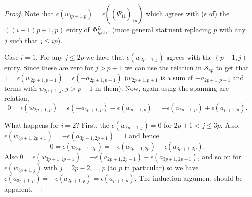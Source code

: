 \documentclass{amsart}
\newcommand*{\subsmallp}[1]{\scalebox{.5}{\ensuremath#1}}
\newcommand{\subpp}[2][p]{\imath_{\hspace*{-1pt}#1}\hspace*{-.5pt}\subsmallp(#2\subsmallp)}
\begin{document}
\begin{enumerate}
\begin{proof}Note that $\epsilon(w_{ip+1,p}) = \epsilon((\Psi_{11}^i)_{1p})$ which agrees with ($\epsilon$ of) the $((i-1)p+1,p)$ entry of $\Phi_{\subpp\alpha}^L$. (more general statment replacing $p$ with any $j$ such that $j\le ip$).

	Case $i=1$. For any $j\le 2p$ we have that $\epsilon(w_{2p+1,j})$ agrees with the $(p+1,j)$ entry. Since these are zero for $j>p+1$ we can use the relation in $\mathscr S_{np}$ to get that $1 = \epsilon(w_{2p+1,p+1}) = \epsilon(-a_{2p+1,p+1})$ ($w_{2p+1,p+1}$ is a sum of $-a_{2p+1,p+1}$ and terms with $w_{2p+1,j}$, $j>p+1$ in them). Now, again using the spanning arc relation, 
			\[0 = \epsilon(w_{2p+1,p}) = \epsilon(-a_{2p+1,p}) - \epsilon(w_{p+1,p}) = -\epsilon(a_{2p+1,p}) + \epsilon(a_{p+1,p}).\]

	What happens for $i=2$? First, the $\epsilon(w_{3p+1,j})=0$ for $2p+1<j\le 3p$. Also, $\epsilon(w_{3p+1,2p+1})=-\epsilon(a_{3p+1,2p+1}) = 1$ and hence 
			\[0=\epsilon(w_{3p+1,2p}) = -\epsilon(a_{2p+1,2p}) - \epsilon(a_{3p+1,2p}).\]
	Also $0=\epsilon(w_{3p+1,2p-1}) = -\epsilon(a_{2p+1,2p-1}) -\epsilon(a_{3p+1,2p-1})$, and so on for $\epsilon(w_{3p+1,j})$ with $j=2p-2,\ldots,p$ (to $p$ in particular) so we have $\epsilon(a_{3p+1,p}) = -\epsilon(a_{2p+1,p}) = \epsilon(a_{p+1,p})$. The induction argument should be apparent.

\end{proof}

\end{enumerate}
\end{document}
